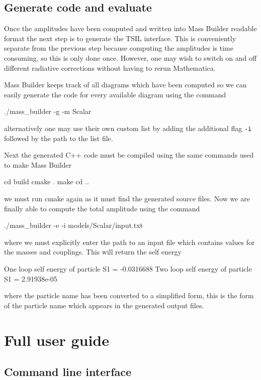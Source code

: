 \subsection{Generate code and evaluate}

Once the amplitudes have been computed and written into Mass Builder readable format the next step is to generate the TSIL interface.  This is conveniently separate from the previous step because computing the amplitudes is time consuming, so this is only done once.  However, one may wish to switch on and off different radiative corrections without having to rerun Mathematica.

Mass Builder keeps track of all diagrams which have been computed so we can easily generate the code for every available diagram using the command
\begin{lstterm}
./mass_builder -g -m Scalar
\end{lstterm}
alternatively one may use their own custom list by adding the additional flag \lstinline{-i} followed by the path to the list file.  

Next the generated C++ code must be compiled using the same commands used to make Mass Builder
\begin{lstterm}
cd build
cmake .
make
cd ..
\end{lstterm}
we must run cmake again as it must find the generated source files.
Now we are finally able to compute the total amplitude using the command
\begin{lstterm}
./mass_builder -e -i models/Scalar/input.txt
\end{lstterm}
where we must explicitly enter the path to an input file which contains values for the masses and couplings.  This will return the self energy
\begin{lstterm}
One loop self energy of particle S1 = -0.0316688
Two loop self energy of particle S1 = 2.91938e-05
\end{lstterm}
where the particle name has been converted to a simplified form, this is the form of the particle name which appears in the generated output files.

\section{Full user guide}\label{sec:user_guide}
\subsection{Command line interface}

